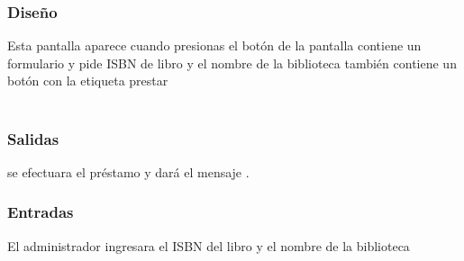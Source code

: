 \subsubsection{Diseño}
	Esta pantalla aparece cuando presionas el botón  de la pantalla  contiene un formulario y pide ISBN de libro y el nombre de la biblioteca también contiene un botón con la etiqueta prestar  \\\\


\subsubsection{Salidas}
	\begin{Citemize}
		\item se efectuara el préstamo y dará el mensaje . 
	\end{Citemize}
	
\subsubsection{Entradas}
	\begin{Citemize}
		\item El administrador ingresara el ISBN del libro y el nombre de la biblioteca
	\end{Citemize}



